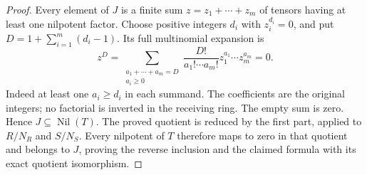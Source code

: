 \begin{proof}
Every element of $J$ is a finite sum
$z=z_1+\cdots+z_m$ of tensors having at
least one nilpotent factor. Choose positive
integers $d_i$ with $z_i^{d_i}=0$, and put
$D=1+\sum_{i=1}^m(d_i-1)$. Its full
multinomial expansion is
$$
z^D=
\sum_{\substack{a_1+\cdots+a_m=D\\a_i\geq0}}
\frac{D!}{a_1!\cdots a_m!}
z_1^{a_1}\cdots z_m^{a_m}=0.
$$
Indeed at least one $a_i\geq d_i$ in each
summand. The coefficients are the original
integers; no factorial is inverted in the
receiving ring. The empty sum is zero.
Hence $J\subseteq\operatorname{Nil}(T)$.
The proved quotient is reduced by the
first part, applied to $R/N_R$ and $S/N_S$.
Every nilpotent of $T$ therefore maps to
zero in that quotient and belongs to $J$,
proving the reverse inclusion and the
claimed formula with its exact quotient
isomorphism.
\end{proof}









